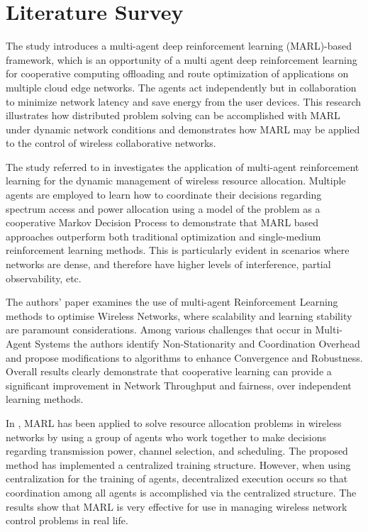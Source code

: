 \documentclass[a4paper,fleqn]{cas-dc}
\numberwithin{equation}{section}
\begin{document}
\section{Literature Survey}

The study \cite{suzuki2023multi}introduces a multi-agent deep reinforcement learning (MARL)-based framework, which is an opportunity of a multi agent deep reinforcement learning for cooperative computing offloading and route optimization of applications on multiple cloud edge networks. The agents act independently but in collaboration to minimize network latency and save energy from the user devices. This research illustrates how distributed problem solving can be accomplished with MARL under dynamic network conditions and demonstrates how MARL may be applied to the control of wireless collaborative networks.

The study referred to in \cite{park2023quantum} investigates the application of multi-agent reinforcement learning  for the dynamic management of wireless resource allocation. Multiple agents are employed to learn how to coordinate their decisions regarding spectrum access and power allocation using a model of the problem as a cooperative Markov Decision Process to demonstrate that MARL based approaches outperform both traditional optimization and single-medium reinforcement learning methods. This is particularly evident in scenarios where networks are dense, and therefore have higher levels of interference, partial observability, etc.

The authors' paper \cite{zhou2025scalable} examines the use of multi-agent Reinforcement Learning methods to optimise Wireless Networks, where scalability and learning stability are paramount considerations. Among various challenges that occur in Multi-Agent Systems the authors identify Non-Stationarity and Coordination Overhead and propose modifications to algorithms to enhance Convergence and Robustness. Overall results clearly demonstrate that cooperative learning can provide a significant improvement in Network Throughput and fairness, over independent learning methods.

In \cite{zhao2023multi}, MARL has been applied to solve resource allocation problems in wireless networks by using a group of agents who work together to make decisions regarding transmission power, channel selection, and scheduling. The proposed method has implemented a centralized training structure. However, when using centralization for the training of agents, decentralized execution occurs so that coordination among all agents is accomplished via the centralized structure. The results show that MARL is very effective for use in managing wireless network control problems in real life.
\end{document}
